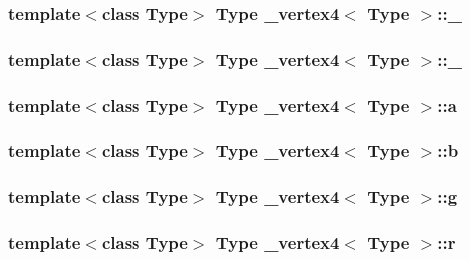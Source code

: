 \hypertarget{class__vertex4_a5023a89cb68c2aa2e43b162d1da600ea}{
\subsubsection[{\+\_\+2}]{\setlength{\rightskip}{0pt plus 5cm}template$<$class Type$>$ Type {\bf \+\_\+vertex4}$<$ Type $>$\+::\+\_}}\label{class__vertex4_a5023a89cb68c2aa2e43b162d1da600ea}
\hypertarget{class__vertex4_af89b099cc7a2a66fc4db9b3cd5c1dcfb}{
\subsubsection[{\+\_\+3}]{\setlength{\rightskip}{0pt plus 5cm}template$<$class Type$>$ Type {\bf \+\_\+vertex4}$<$ Type $>$\+::\+\_}}\label{class__vertex4_af89b099cc7a2a66fc4db9b3cd5c1dcfb}
\hypertarget{class__vertex4_abf7dc914b992f38df50edbcf9e1be42f}{
\subsubsection[{a}]{\setlength{\rightskip}{0pt plus 5cm}template$<$class Type$>$ Type {\bf \+\_\+vertex4}$<$ Type $>$\+::a}}\label{class__vertex4_abf7dc914b992f38df50edbcf9e1be42f}
\hypertarget{class__vertex4_ae084625b6693f09ee69fa757251b2f9f}{
\subsubsection[{b}]{\setlength{\rightskip}{0pt plus 5cm}template$<$class Type$>$ Type {\bf \+\_\+vertex4}$<$ Type $>$\+::b}}\label{class__vertex4_ae084625b6693f09ee69fa757251b2f9f}
\hypertarget{class__vertex4_ab797194de019a14415db3d6c67b53286}{
\subsubsection[{g}]{\setlength{\rightskip}{0pt plus 5cm}template$<$class Type$>$ Type {\bf \+\_\+vertex4}$<$ Type $>$\+::g}}\label{class__vertex4_ab797194de019a14415db3d6c67b53286}
\hypertarget{class__vertex4_a652faf982e13d7d4ad57c7aa5b933272}{
\subsubsection[{r}]{\setlength{\rightskip}{0pt plus 5cm}template$<$class Type$>$ Type {\bf \+\_\+vertex4}$<$ Type $>$\+::r}}\label{class__vertex4_a652faf982e13d7d4ad57c7aa5b933272}
